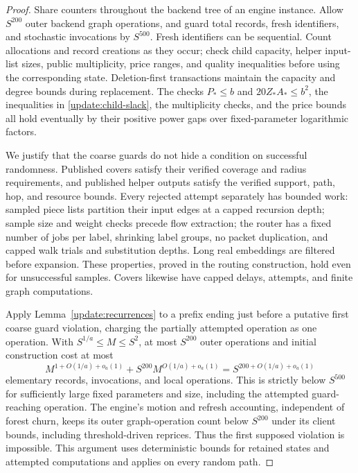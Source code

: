\begin{proof}
Share counters throughout the backend tree of an engine instance.
Allow $S^{200}$ outer backend graph operations, and guard total
records, fresh identifiers, and stochastic invocations by
$S^{500}$.  Fresh identifiers can be sequential.  Count
allocations and record creations as they occur; check child
capacity, helper input-list sizes, public multiplicity, price
ranges, and quality inequalities before using the corresponding
state.  Deletion-first transactions maintain the capacity and
degree bounds during replacement.  The checks
$P_*\le b$ and $20Z_*A_*\le b^2$, the inequalities in
\eqref{update:child-slack}, the multiplicity checks, and the
price bounds all hold eventually by their positive power gaps
over fixed-parameter logarithmic factors.

We justify that the coarse guards do not hide a condition on
successful randomness.  Published covers satisfy their verified
coverage and radius requirements, and published helper outputs
satisfy the verified support, path, hop, and resource bounds.
Every rejected attempt separately has bounded work: sampled
piece lists partition their input edges at a capped recursion
depth; sample size and weight checks precede flow extraction;
the router has a fixed number of jobs per label, shrinking label
groups, no packet duplication, and capped walk trials and
substitution depths.  Long real embeddings are filtered before
expansion.  These properties, proved in the routing construction,
hold even for unsuccessful samples.  Covers likewise have
capped delays, attempts, and finite graph computations.

Apply Lemma~\ref{update:recurrences} to a prefix ending just
before a putative first coarse guard violation, charging the
partially attempted operation as one operation.  With
$S^{1/a}\le M\le S^2$, at most $S^{200}$ outer operations and
initial construction cost at most
\[
 M^{1+O(1/a)+o_a(1)}
       +S^{200}M^{O(1/a)+o_a(1)}
       =S^{200+O(1/a)+o_a(1)}
\]
elementary records, invocations, and local operations.  This is
strictly below $S^{500}$ for sufficiently large fixed parameters
and size, including the attempted guard-reaching operation.
The engine's motion and refresh accounting, independent of
forest churn, keeps its outer graph-operation count below
$S^{200}$ under its client bounds, including threshold-driven
reprices.  Thus the first supposed violation is impossible.
This argument uses deterministic bounds for retained states and
attempted computations and applies on every random path.


\end{proof}
